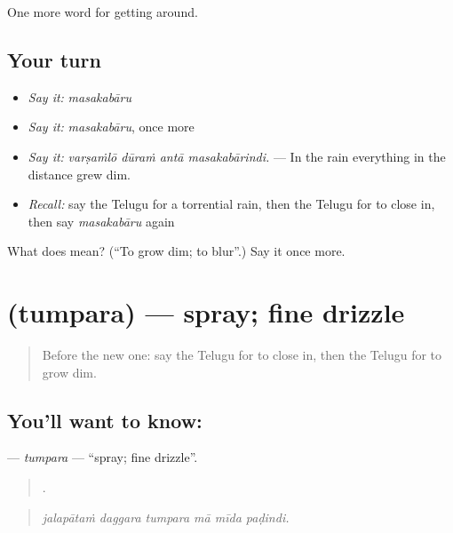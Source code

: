 \begin{grammarlens}[title={What you've built}]
One more word for getting around.
\end{grammarlens}

\subsection*{Your turn}
\begin{itemize}
\raggedright
  \item \emph{Say it:} \emph{masakabāru}
  \item \emph{Say it:} \emph{masakabāru}, once more
  \item \emph{Say it:} \emph{varṣaṁlō dūraṁ antā masakabārindi.} — In the rain everything in the distance grew dim.
  \item \emph{Recall:} say the Telugu for a torrential rain, then the Telugu for to close in, then say \emph{masakabāru} again
\end{itemize}

\begin{tcolorbox}[breakable,colback=teal!4,colframe=teal!35!black,title={Before you move on}]
What does  mean? (\textquotedblleft{}To grow dim; to blur\textquotedblright{}.) Say it once more.
\end{tcolorbox}
\section[\texorpdfstring{\te{తుంపర} (tumpara)}{తుంపర (tumpara)}]{ (tumpara) — spray; fine drizzle}

\label{lesson:TE-C479-tumpara}



\begin{quote}
Before the new one: say the Telugu for to close in, then the Telugu for to grow dim.
\end{quote}

\subsection*{You'll want to know: }
\textbf{} — \emph{tumpara} — \textquotedblleft{}spray; fine drizzle\textquotedblright{}.

\begin{quote}
     .
\end{quote}

\begin{quote}
\emph{jalapātaṁ daggara tumpara mā mīda paḍindi.}
\end{quote}

